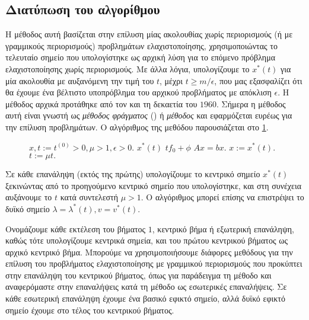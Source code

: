 \subsection{Διατύπωση του αλγορίθμου }
Η μέθοδος αυτή βασίζεται στην επίλυση μίας ακολουθίας χωρίς περιορισμούς (ή με
γραμμικούς περιορισμούς) προβλημάτων ελαχιστοποίησης, χρησιμοποιώντας το
τελευταίο σημείο που υπολογίστηκε ως αρχική λύση για το επόμενο πρόβλημα
ελαχιστοποίησης χωρίς περιορισμούς. Με άλλα λόγια, υπολογίζουμε το
\( x^*(t) \) για μία ακολουθία με αυξανόμενη την τιμή του \( t \), μέχρι
\(  t \geq m/\epsilon \), που μας εξασφαλίζει ότι θα έχουμε ένα βέλτιστο
υποπρόβλημα του αρχικού προβλήματος με απόκλιση \( \epsilon \).  Η μέθοδος
αρχικά προτάθηκε από τον  και  τη δεκαετία του
\(1960\). Σήμερα η μέθοδος αυτή είναι γνωστή ως \emph{μέθοδος φράγματος}
() ή \emph{ μέθοδος} και εφαρμόζεται
ευρέως για την επίλυση προβλημάτων. Ο αλγόριθμος της
μεθόδου παρουσιάζεται στο \ref{alg:ip_bm}.
\begin{figure}[h]
    \begin{otherlanguage}{english}
        \begin{algorithmic}
            \REQUIRE {}$x,
            t:=t^{(0)}>0,\mu>1,$$\epsilon>0.$
            \REPEAT
            \STATE {}
            \(x^*(t)\)
            \( tf_0 + \phi \)
            \STATE {} \(Ax = b \)\(x.\)
            \STATE {}\(x := x^*(t).\)
            \STATE {}\(t := \mu t.\)
        \end{algorithmic}
    \end{otherlanguage}
    \caption{}
    \label{alg:ip_bm}
\end{figure}

Σε κάθε επανάληψη (εκτός της πρώτης) υπολογίζουμε το κεντρικό σημείο
\( x^*(t) \) ξεκινώντας από το προηγούμενο κεντρικό σημείο που υπολογίστηκε, και
στη συνέχεια αυξάνουμε το \( t \) κατά συντελεστή \( \mu > 1 \). Ο αλγόριθμος
μπορεί επίσης να επιστρέψει το δυϊκό σημείο \( \lambda = \lambda^*(t), v =
v^*(t) \).

Ονομάζουμε κάθε εκτέλεση του βήματος \( 1 \), κεντρικό βήμα ή εξωτερική επανάληψη,
καθώς τότε υπολογίζουμε κεντρικά σημεία, και του πρώτου κεντρικού βήματος ως
αρχικό κεντρικό βήμα.  Μπορούμε να χρησιμοποιήσουμε διάφορες μεθόδους για την
επίλυση του προβλήματος ελαχιστοποίησης με γραμμικού περιορισμούς που προκύπτει
στην επανάληψη του κεντρικού βήματος, όπως για παράδειγμα τη μέθοδο
 και αναφερόμαστε στην επαναλήψεις κατά τη μέθοδο 
ως εσωτερικές επαναλήψεις. Σε κάθε εσωτερική επανάληψη έχουμε ένα βασικό
εφικτό σημείο, αλλά δυϊκό εφικτό σημείο έχουμε στο τέλος του κεντρικού βήματος.

